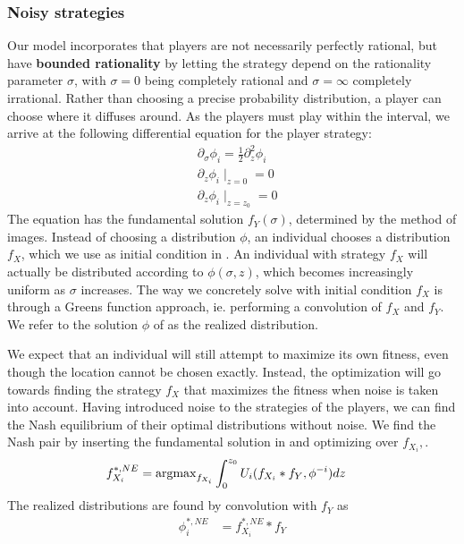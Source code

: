 \subsubsection*{Noisy strategies}
Our model incorporates that players are not necessarily perfectly rational, but have \textbf{bounded rationality} by letting the strategy depend on the rationality parameter $\sigma$, with $\sigma=0$ being completely rational and $\sigma = \infty$ completely irrational. Rather than choosing a precise probability distribution, a player can choose where it diffuses around. As the players must play within the interval, we arrive at the following differential equation for the player strategy:
\begin{align}
  \label{eq:density_PDE}
	&\partial_\sigma \phi_i = \frac{1}{2}\partial_z^2 \phi_i \\
	&\partial_z \phi_i \mid_{z=0} = 0 \\
  &\partial_z \phi_i \mid_{z = z_0} = 0
\end{align}
The equation  has the fundamental solution $f_Y(\sigma)$, determined by the method of images. Instead of choosing a distribution $\phi$, an individual chooses a distribution $f_X$, which we use as initial condition in . An individual with strategy $f_X$ will actually be distributed according to $\phi(\sigma,z)$, which becomes increasingly uniform as $\sigma$ increases. The way we concretely solve  with initial condition $f_X$ is through a Greens function approach, ie. performing a convolution of $f_X$ and $f_Y$. We refer to the solution $\phi$ of  as the realized distribution.

We expect that an individual will still attempt to maximize its own fitness, even though the location cannot be chosen exactly. Instead, the optimization will go towards finding the strategy $f_X$ that maximizes the fitness when noise is taken into account.
Having introduced noise to the strategies of the players, we can find the Nash equilibrium of their optimal distributions without noise. We find the Nash pair by inserting the fundamental solution in  and optimizing over $f_{X_i},$.
\begin{align*}
	f_{X_i}^{*,NE} &=  \argmax_{f_{X_i}}  \int_0^{z_0} U_i(f_{X_i}*f_Y, \phi^{-i}) dz
\end{align*}
The realized distributions are found by convolution with $f_Y$ as
\begin{align*}
  \phi_i^{*,NE} &= f_{X_i}^{*,NE} * f_Y \\
\end{align*}

